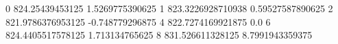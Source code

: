 0 824.25439453125 1.5269775390625
1 823.3226928710938 0.59527587890625
2 821.9786376953125 -0.748779296875
4 822.7274169921875 0.0
6 824.4405517578125 1.713134765625
8 831.526611328125 8.7991943359375
